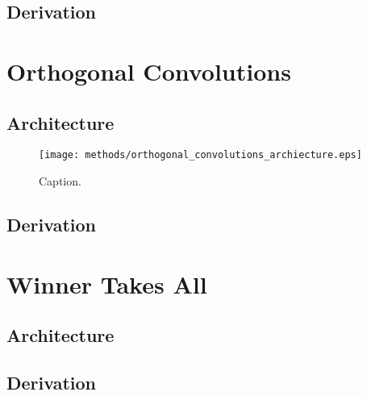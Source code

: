 \subsection{Derivation}

%
%
%
%
%
\section{Orthogonal Convolutions}
\lipsum[2]
\subsection{Architecture}
\begin{figure}[h!]
\centering
\captionsetup{justification=centering}
\texttt{[image: methods/orthogonal\_convolutions\_archiecture.eps]}
\caption{Caption.}
\label{fig:orthogonal_convolutions_archiecture}
\end{figure}

\subsection{Derivation}

%
%
%
%
%
\section{Winner Takes All}
\lipsum[2]
\subsection{Architecture}
\subsection{Derivation}
